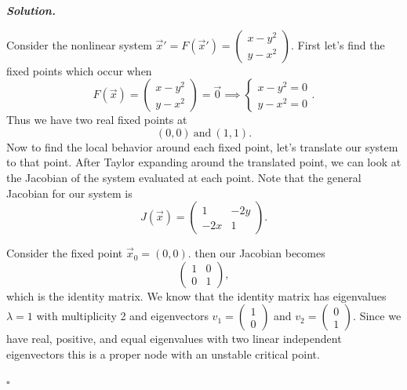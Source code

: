 \documentclass[12pt]{report}
\newenvironment{solution}[1][\it{Solution}]{\textbf{#1. } }{$\square$}
\begin{document}
\begin{solution}

    \noindent
    Consider the nonlinear system $\vec{x}' = F(\vec{x}') = \begin{pmatrix}
        x - y^2\\
        y - x^2
    \end{pmatrix}.$ First let's find the fixed points which occur when
    \[
        F(\vec{x}) = \begin{pmatrix}
            x - y^2\\
            y - x^2
        \end{pmatrix} = \vec{0} \implies \begin{cases}
            x - y^2 = 0\\
            y - x^2 = 0
        \end{cases}.
    \] 
    Thus we have two real fixed points at
    \[ 
        (0,0) ~\text{and}~ (1,1).
    \]
    Now to find the local behavior around each fixed point, let's translate our system to that point. After Taylor expanding around the translated point, we can look at the Jacobian of the system evaluated at each point. Note that the general Jacobian for our system is
    \[ 
        J(\vec{x}) = \begin{pmatrix}
            1 & -2y\\
            -2x & 1
        \end{pmatrix}.
    \]
    
    \noindent
    Consider the fixed point $\vec{x}_0 = (0,0)$. then our Jacobian becomes
    \[ 
        \begin{pmatrix}
            1 & 0\\
            0 & 1
        \end{pmatrix},
    \]
    which is the identity matrix. We know that the identity matrix has eigenvalues $\lambda = 1$ with multiplicity 2 and eigenvectors $v_1 = \begin{pmatrix}
        1 \\ 0
    \end{pmatrix}$ and $v_2 = \begin{pmatrix}
        0 \\ 1
    \end{pmatrix}$. Since we have real, positive, and equal eigenvalues with two linear independent eigenvectors this is a proper node with an unstable critical point. 



\end{solution}
\end{document}

